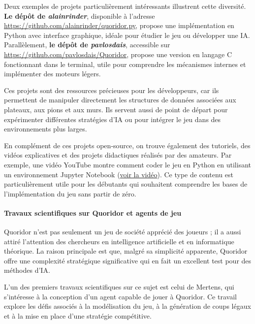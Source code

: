 \documentclass[a4paper]{article}
\begin{document}
Deux exemples de projets particulièrement intéressants illustrent cette diversité. \textbf{Le dépôt de \textit{alainrinder}}, disponible à l’adresse \href{https://github.com/alainrinder/quoridor.py}{\url{https://github.com/alainrinder/quoridor.py}}, propose une implémentation en Python avec interface graphique, idéale pour étudier le jeu ou développer une IA. Parallèlement, \textbf{le dépôt de \textit{pavlosdais}}, accessible sur \href{https://github.com/pavlosdais/Quoridor}{\url{https://github.com/pavlosdais/Quoridor}}, propose une version en langage C fonctionnant dans le terminal, utile pour comprendre les mécanismes internes et implémenter des moteurs légers.

Ces projets sont des ressources précieuses pour les développeurs, car ils permettent de manipuler directement les structures de données associées aux plateaux, aux pions et aux murs. Ils servent aussi de point de départ pour expérimenter différentes stratégies d’IA ou pour intégrer le jeu dans des environnements plus larges.

En complément de ces projets open‑source, on trouve également des tutoriels, des vidéos explicatives et des projets didactiques réalisés par des amateurs. Par exemple, une vidéo YouTube montre comment coder le jeu en Python en utilisant un environnement Jupyter Notebook (\href{https://youtu.be/KlktFXtj_qk?si=NpsYhWHdBjuhytDP}{voir la vidéo}). Ce type de contenu est particulièrement utile pour les débutants qui souhaitent comprendre les bases de l’implémentation du jeu sans partir de zéro.

\paragraph{Travaux scientifiques sur Quoridor et agents de jeu}

Quoridor n’est pas seulement un jeu de société apprécié des joueurs ; il a aussi attiré l’attention des chercheurs en intelligence artificielle et en informatique théorique. La raison principale est que, malgré sa simplicité apparente, Quoridor offre une complexité stratégique significative qui en fait un excellent test pour des méthodes d’IA.

L’un des premiers travaux scientifiques sur ce sujet est celui de Mertens, qui s’intéresse à la conception d’un agent capable de jouer à Quoridor\cite{mertens2006}. Ce travail explore les défis associés à la modélisation du jeu, à la génération de coups légaux et à la mise en place d’une stratégie compétitive.
\end{document}
